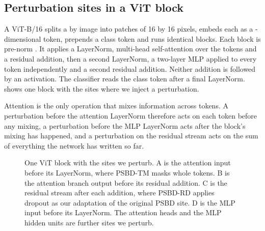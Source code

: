 \subsection{Perturbation sites in a ViT block}
A ViT-B/16 \cite{dosovitskiy2021an} splits a \ModelInputSize{} by \ModelInputSize{} image into \VitPatches{} patches of 16 by 16 pixels, embeds each as a \VitWidth{}-dimensional token, prepends a class token and runs \VitBlocks{} identical blocks. Each block is pre-norm \cite{xiong2020layernorm}. It applies a LayerNorm, multi-head self-attention over the \VitTokens{} tokens and a residual addition, then a second LayerNorm, a two-layer MLP applied to every token independently and a second residual addition. Neither addition is followed by an activation. The classifier reads the class token after a final LayerNorm.  shows one block with the sites where we inject a perturbation.

Attention is the only operation that mixes information across tokens. A perturbation before the attention LayerNorm therefore acts on each token before any mixing, a perturbation before the MLP LayerNorm acts after the block's mixing has happened, and a perturbation on the residual stream acts on the sum of everything the network has written so far.

\begin{figure}[t]
\centering

\caption{One ViT block with the sites we perturb. A is the attention input before its LayerNorm, where PSBD-TM masks whole tokens. B is the attention branch output before its residual addition. C is the residual stream after each addition, where PSBD-RD applies dropout as our adaptation of the original PSBD site. D is the MLP input before its LayerNorm. The attention heads and the MLP hidden units are further sites we perturb.}
\label{fig:vit-block}
\end{figure}
